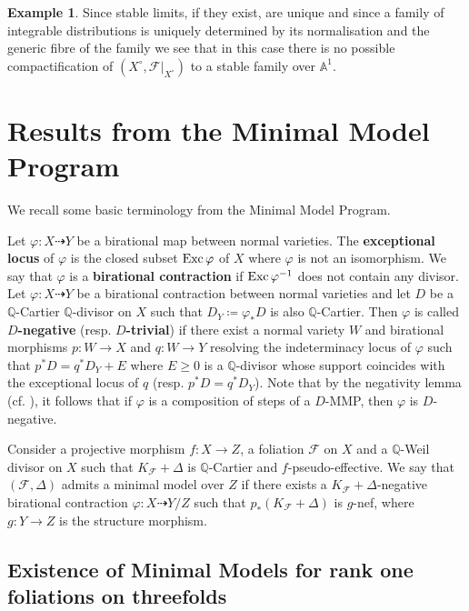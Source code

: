 \documentclass[12pt, a4paper]{amsart}
\theoremstyle{definition}
\newtheorem{ej}[theorem]{Example}
\theoremstyle{named}
\begin{document}
\begin{ej}
Since stable limits, if they exist, are unique
and since a family of integrable distributions is uniquely determined by its normalisation and the generic fibre of the family we see that in this case there is no possible compactification of $(X^\circ, \mathcal F|_{X^\circ})$ to a stable family over $\mathbb A^1$.    
\end{ej}

\appendix

\section{Results from the Minimal Model Program}
\label{mmp}

We recall some basic terminology from the Minimal Model Program.

Let 
$\varphi\colon X\dashrightarrow Y$ be a birational map between normal varieties.  The {\bf exceptional locus}  of $\varphi$ is the closed subset 
${\rm Exc\, }\varphi$ of $X$ where $\varphi$ is not an isomorphism. We say that $\varphi$ is  a {\bf birational contraction} if ${\rm Exc\, } \varphi^{-1}$ does not contain any divisor. Let $\varphi\colon X\dashrightarrow Y$ be a birational contraction between normal varieties and let  $D$ be a $\mathbb Q$-Cartier $\mathbb Q$-divisor on $X$ such that $D_Y\coloneqq \varphi_*D$ is also $\mathbb Q$-Cartier. Then $\varphi$ is called {\bf $D$-negative} (resp. {\bf $D$-trivial}) if there exist a normal variety $W$ and birational morphisms $p\colon W\to X$ and $q\colon W\to Y$  resolving the indeterminacy locus of $\varphi$  such that $p^*D=q^*D_Y+E$ where  $E\ge 0$ is a $\mathbb Q$-divisor whose support coincides with the exceptional locus of $q$ 
(resp. $p^*D=q^*D_Y$). Note that by the negativity lemma (cf. \cite[Lemma 3.39]{KM98}), it follows that if $\varphi$ is a composition of steps of a $D$-MMP, then $\varphi$ is $D$-negative. 




Consider a projective morphism $f\colon X \to Z$, 
a foliation $\mathcal F$ on $X$ and a $\mathbb Q$-Weil divisor on $X$ such that $K_{\mathcal F}+\Delta$ is $\mathbb Q$-Cartier and $f$-pseudo-effective.
We say that $(\mathcal F, \Delta)$
admits a minimal model over $Z$ if 
there exists a $K_{\mathcal F}+\Delta$-negative birational contraction $\varphi\colon X \dashrightarrow Y/Z$ such that $p_*(K_{\mathcal F}+\Delta)$ is $g$-nef, where $g\colon Y \to Z$ is the structure morphism. 

\subsection{Existence of Minimal Models for rank one foliations on threefolds}
\end{document}
